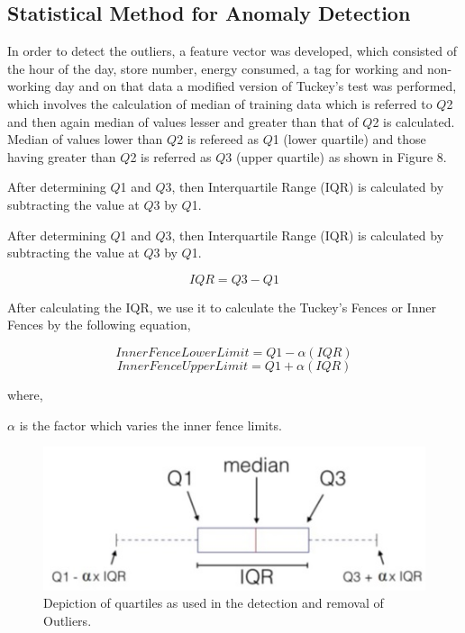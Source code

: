 \documentclass[conference]{IEEEtran}
\begin{document}
\subsection{\label{sec:level2}	Statistical Method for Anomaly Detection}
In order to detect the outliers, a feature vector was developed, which consisted of the hour of the day, store number, energy consumed, a tag for working and non-working day and on that data a modified version of Tuckey's test was performed, which involves the calculation of median of training data which is referred to $\mathit{Q}$2 and then again median of values lesser and greater than that of $\mathit{Q}$2  is calculated. Median of values lower than $\mathit{Q}$2  is refereed as $\mathit{Q}$1  (lower quartile) and those having greater than $\mathit{Q}$2 is referred as $\mathit{Q}$3  (upper quartile) as shown in Figure 8. 

After determining $\mathit{Q}$1 and $\mathit{Q}$3, then Interquartile Range (IQR) is calculated by subtracting the value at $\mathit{Q}$3 by $\mathit{Q}$1.


After determining $\mathit{Q}$1 and $\mathit{Q}$3, then Interquartile Range (IQR) is calculated by subtracting the value at $\mathit{Q}$3 by $\mathit{Q}$1.

\begin{equation}
IQR = Q3 - Q1
\end{equation}

After calculating the IQR, we use it to calculate the Tuckey's Fences or Inner Fences by the following equation,

\begin{equation}
InnerFenceLowerLimit = Q1 - \alpha (IQR)
\end{equation}
\begin{equation}
InnerFenceUpperLimit = Q1 + \alpha (IQR)
\end{equation}

where,

$\mathit{\alpha}$ is the factor which varies the inner fence limits.

\begin{figure}[t]
	\includegraphics[width=\linewidth]{IQR.jpg}
	\caption{Depiction of quartiles as used in the detection and removal of
		Outliers.}
	\label{fig:boat0}
\end{figure}
\end{document}
